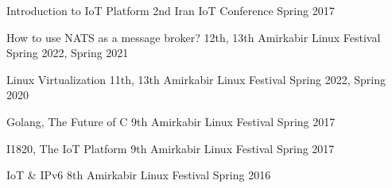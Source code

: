 \cventry{}
  {Introduction to IoT Platform}
  {}
  {2nd Iran IoT Conference}
  {}
  {Spring 2017}

\cventry{}
  {How to use NATS as a message broker?}
  {}
  {12th, 13th Amirkabir Linux Festival}
  {}
  {Spring 2022, Spring 2021}

\cventry{}
  {Linux Virtualization}
  {}
  {11th, 13th Amirkabir Linux Festival}
  {}
  {Spring 2022, Spring 2020}

\cventry{}
  {Golang, The Future of C}
  {}
  {9th Amirkabir Linux Festival}
  {}
  {Spring 2017}

\cventry{}
  {I1820, The IoT Platform}
  {}
  {9th Amirkabir Linux Festival}
  {}
  {Spring 2017}

\cventry{}
  {IoT \& IPv6}
  {}
  {8th Amirkabir Linux Festival}
  {}
  {Spring 2016}
